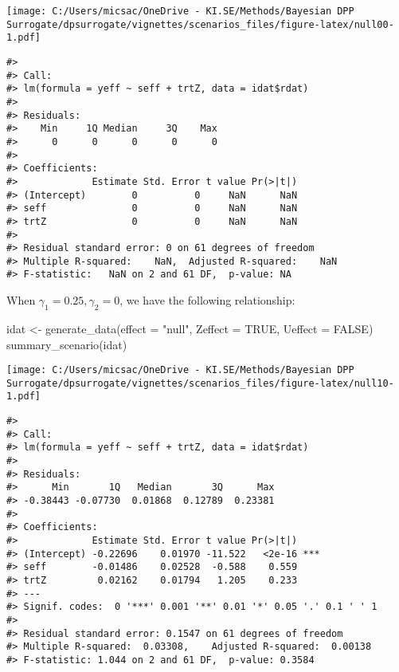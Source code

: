 \documentclass[
]{article}
\newenvironment{Shaded}{\begin{snugshade}}{\end{snugshade}}
\newcommand{\AttributeTok}[1]{\textcolor[rgb]{0.77,0.63,0.00}{#1}}
\newcommand{\ConstantTok}[1]{\textcolor[rgb]{0.00,0.00,0.00}{#1}}
\newcommand{\FunctionTok}[1]{\textcolor[rgb]{0.00,0.00,0.00}{#1}}
\newcommand{\NormalTok}[1]{#1}
\newcommand{\OtherTok}[1]{\textcolor[rgb]{0.56,0.35,0.01}{#1}}
\newcommand{\StringTok}[1]{\textcolor[rgb]{0.31,0.60,0.02}{#1}}
\begin{document}
\texttt{[image: C:/Users/micsac/OneDrive - KI.SE/Methods/Bayesian DPP Surrogate/dpsurrogate/vignettes/scenarios\_files/figure-latex/null00-1.pdf]}

\begin{verbatim}
#> 
#> Call:
#> lm(formula = yeff ~ seff + trtZ, data = idat$rdat)
#> 
#> Residuals:
#>    Min     1Q Median     3Q    Max 
#>      0      0      0      0      0 
#> 
#> Coefficients:
#>             Estimate Std. Error t value Pr(>|t|)
#> (Intercept)        0          0     NaN      NaN
#> seff               0          0     NaN      NaN
#> trtZ               0          0     NaN      NaN
#> 
#> Residual standard error: 0 on 61 degrees of freedom
#> Multiple R-squared:    NaN,  Adjusted R-squared:    NaN 
#> F-statistic:   NaN on 2 and 61 DF,  p-value: NA
\end{verbatim}

When \(\gamma_1 = 0.25, \gamma_2 = 0\), we have the following
relationship:

\begin{Shaded}
\begin{Highlighting}[]
\NormalTok{idat }\OtherTok{\textless{}{-}} \FunctionTok{generate\_data}\NormalTok{(}\AttributeTok{effect =} \StringTok{"null"}\NormalTok{, }\AttributeTok{Zeffect =} \ConstantTok{TRUE}\NormalTok{, }\AttributeTok{Ueffect =} \ConstantTok{FALSE}\NormalTok{)}
\FunctionTok{summary\_scenario}\NormalTok{(idat)}
\end{Highlighting}
\end{Shaded}

\texttt{[image: C:/Users/micsac/OneDrive - KI.SE/Methods/Bayesian DPP Surrogate/dpsurrogate/vignettes/scenarios\_files/figure-latex/null10-1.pdf]}

\begin{verbatim}
#> 
#> Call:
#> lm(formula = yeff ~ seff + trtZ, data = idat$rdat)
#> 
#> Residuals:
#>      Min       1Q   Median       3Q      Max 
#> -0.38443 -0.07730  0.01868  0.12789  0.23381 
#> 
#> Coefficients:
#>             Estimate Std. Error t value Pr(>|t|)    
#> (Intercept) -0.22696    0.01970 -11.522   <2e-16 ***
#> seff        -0.01486    0.02528  -0.588    0.559    
#> trtZ         0.02162    0.01794   1.205    0.233    
#> ---
#> Signif. codes:  0 '***' 0.001 '**' 0.01 '*' 0.05 '.' 0.1 ' ' 1
#> 
#> Residual standard error: 0.1547 on 61 degrees of freedom
#> Multiple R-squared:  0.03308,    Adjusted R-squared:  0.00138 
#> F-statistic: 1.044 on 2 and 61 DF,  p-value: 0.3584
\end{verbatim}
\end{document}
